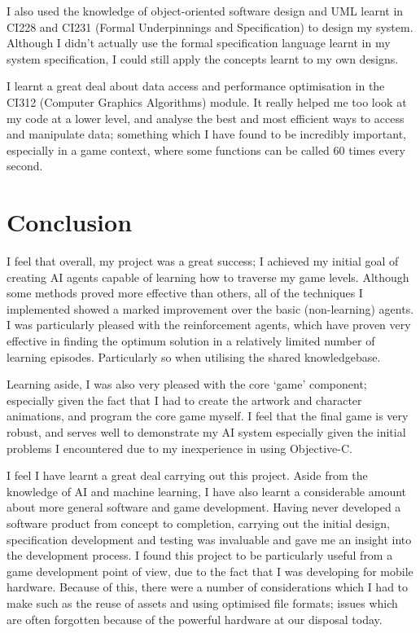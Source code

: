 \documentclass[a4paper,oneside]{report}
\begin{document}
I also used the knowledge of object-oriented software design and UML learnt in CI228 and CI231 (Formal Underpinnings and Specification) to design my system. Although I didn't actually use the formal specification language learnt in my system specification, I could still apply the concepts learnt to my own designs.

I learnt a great deal about data access and performance optimisation in the CI312 (Computer Graphics Algorithms) module. It really helped me too look at my code at a lower level, and analyse the best and most efficient ways to access and manipulate data; something which I have found to be incredibly important, especially in a game context, where some functions can be called 60 times every second.

\section{Conclusion}

I feel that overall, my project was a great success; I achieved my initial goal of creating AI agents capable of learning how to traverse my game levels. Although some methods proved more effective than others, all of the techniques I implemented showed a marked improvement over the basic (non-learning) agents. I was particularly pleased with the reinforcement agents, which have proven very effective in finding the optimum solution in a relatively limited number of learning episodes. Particularly so when utilising the shared knowledgebase. 

Learning aside, I was also very pleased with the core `game' component; especially given the fact that I had to create the artwork and character animations, and program the core game myself. I feel that the final game is very robust, and serves well to demonstrate my AI system especially given the initial problems I encountered due to my inexperience in using Objective-C.

I feel I have learnt a great deal carrying out this project. Aside from the knowledge of AI and machine learning, I have also learnt a considerable amount about more general software and game development. Having never developed a software product from concept to completion, carrying out the initial design, specification development and testing was invaluable and gave me an insight into the development process. I found this project to be particularly useful from a game development point of view, due to the fact that I was developing for mobile hardware. Because of this, there were a number of considerations which I had to make such as the reuse of assets and using optimised file formats; issues which are often forgotten because of the powerful hardware at our disposal today.
\end{document}
